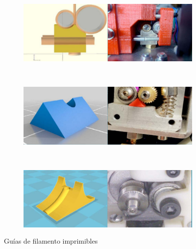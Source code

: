 \documentclass[11pt,a4paper]{article}
\begin{document}
\begin{figure}[H]
    \centering
    \begin{subfigure}[b]{0.5\textwidth}
        \includegraphics[width=\textwidth,cfbox=azul_marcos 4pt 0pt]{FOTOS/GUIA1}
    \end{subfigure}
    ~ %
    \begin{subfigure}[b]{0.5\textwidth}
        \includegraphics[width=\textwidth,cfbox=azul_marcos 4pt 0pt]{FOTOS/GUIA2}
    \end{subfigure}
    ~ %
    \begin{subfigure}[b]{0.5\textwidth}
        \includegraphics[width=\textwidth,cfbox=azul_marcos 4pt 0pt]{FOTOS/GUIA3}
    \end{subfigure}
    \caption*{Guías de filamento imprimibles}
\end{figure}	
\end{document}
